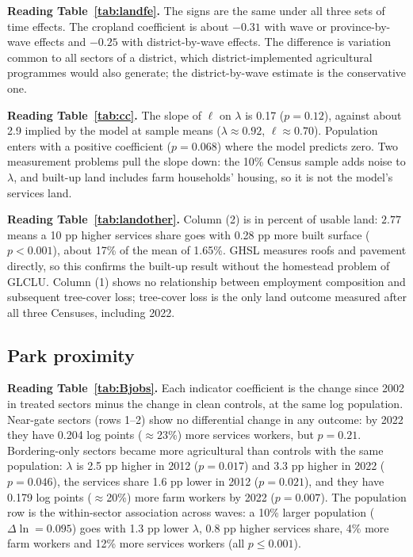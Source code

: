 \documentclass[11pt]{article}
\begin{document}

\noindent\textbf{Reading Table~\ref{tab:landfe}.} The signs are the same under all three sets of time effects. The cropland coefficient is about $-0.31$ with wave or province-by-wave effects and $-0.25$ with district-by-wave effects. The difference is variation common to all sectors of a district, which district-implemented agricultural programmes would also generate; the district-by-wave estimate is the conservative one.


\noindent\textbf{Reading Table~\ref{tab:cc}.} The slope of $\ell$ on $\lambda$ is 0.17 ($p=0.12$), against about 2.9 implied by the model at sample means ($\lambda\approx0.92$, $\ell\approx0.70$). Population enters with a positive coefficient ($p=0.068$) where the model predicts zero. Two measurement problems pull the slope down: the 10\% Census sample adds noise to $\lambda$, and built-up land includes farm households' housing, so it is not the model's services land.


\noindent\textbf{Reading Table~\ref{tab:landother}.} Column (2) is in percent of usable land: $2.77$ means a 10 pp higher services share goes with 0.28 pp more built surface ($p<0.001$), about 17\% of the mean of 1.65\%. GHSL measures roofs and pavement directly, so this confirms the built-up result without the homestead problem of GLCLU. Column (1) shows no relationship between employment composition and subsequent tree-cover loss; tree-cover loss is the only land outcome measured after all three Censuses, including 2022.

\subsection{Park proximity}


\noindent\textbf{Reading Table~\ref{tab:Bjobs}.} Each indicator coefficient is the change since 2002 in treated sectors minus the change in clean controls, at the same log population. Near-gate sectors (rows 1--2) show no differential change in any outcome: by 2022 they have 0.204 log points ($\approx$23\%) more services workers, but $p=0.21$. Bordering-only sectors became more agricultural than controls with the same population: $\lambda$ is 2.5 pp higher in 2012 ($p=0.017$) and 3.3 pp higher in 2022 ($p=0.046$), the services share 1.6 pp lower in 2012 ($p=0.021$), and they have 0.179 log points ($\approx$20\%) more farm workers by 2022 ($p=0.007$). The population row is the within-sector association across waves: a 10\% larger population ($\Delta\ln=0.095$) goes with 1.3 pp lower $\lambda$, 0.8 pp higher services share, 4\% more farm workers and 12\% more services workers (all $p\le0.001$).
\end{document}
